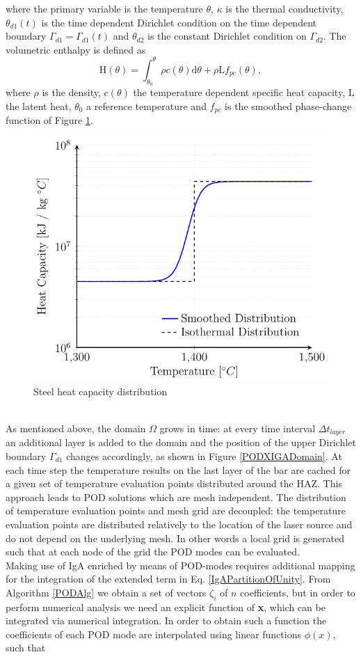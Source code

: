 \documentclass[3p]{article}
\begin{document}
where the primary variable is the temperature $\theta$, $\kappa$ is the thermal conductivity, $\theta_{d1}(t)$ is the time dependent Dirichlet condition on the time dependent boundary $\Gamma_{d1}=\Gamma_{d1}(t)$ and $\theta_{d2}$ is the constant Dirichlet condition on $\Gamma_{d2}$. The volumetric enthalpy is defined as
\begin{equation}
\mathrm{H}(\theta)=\int_{\theta_{0}}^{\theta}\rho c(\theta) \text{d}\theta+\rho\mathrm{L}f_{pc}(\theta),
\end{equation}
where $\rho$ is the density, $c(\theta)$ the temperature dependent specific heat capacity, $\mathrm{L}$ the latent heat, $\theta_{0}$ a reference temperature and $f_{pc}$ is the smoothed phase-change function of Figure \ref{fig:heatCapacity}.
\begin{figure}[!h]
\centering
  \includegraphics[width=0.5\linewidth]{externals/Pictures/heatCapacity.pdf}
  \caption{Steel heat capacity distribution}
  \label{fig:heatCapacity}
\end{figure}
\\
\indent
As mentioned above, the domain $\Omega$ grows in time: at every time interval $\Delta t_{layer}$ an additional layer is added to the domain and the position of the upper Dirichlet boundary $\Gamma_{d1}$ changes accordingly, as shown in Figure \ref{PODXIGADomain}. At each time step the temperature results on the last layer of the bar are cached for a given set of temperature evaluation points distributed around the HAZ. This approach leads to POD solutions which are mesh independent. The distribution of temperature evaluation points and mesh grid are decoupled: the temperature evaluation points are distributed relatively to the location of the laser source and do not depend on the underlying mesh. In other words a local grid is generated such that at each node of the grid the POD modes can be evaluated. \\
\indent 
Making use of IgA enriched by means of POD-modes requires additional mapping for the integration of the extended term in Eq. \ref{IgAPartitionOfUnity}. From Algorithm \ref{PODAlg} we obtain a set of vectors $\zeta_{i}$ of $n$ coefficients, but in order to perform numerical analysis we need an explicit function of \textbf{x}, which can be integrated via numerical integration. In order to obtain such a function the coefficients of each POD mode are interpolated using linear functions $\phi(x)$, such that
\end{document}
